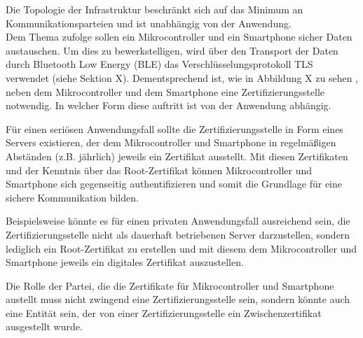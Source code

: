 Die Topologie der Infrastruktur beschränkt sich auf das Minimum an Kommunikationsparteien und ist unabhängig von der Anwendung.\\


Dem Thema zufolge sollen ein Mikrocontroller und ein Smartphone sicher Daten austauschen. Um dies zu bewerkstelligen, wird über den Transport der Daten durch Bluetooth Low Energy (BLE) das Verschlüsselungsprotokoll TLS verwendet (siehe Sektion X). 
Dementsprechend ist, wie in Abbildung X zu sehen
, neben dem Mikrocontroller und dem Smartphone eine Zertifizierungsstelle notwendig. In welcher Form diese auftritt ist von der Anwendung abhängig.

Für einen seriösen Anwendungsfall sollte die Zertifizierungsstelle in Form eines Servers existieren, der dem Mikrocontroller und Smartphone in regelmäßigen Abständen (z.B. jährlich) jeweils ein Zertifikat ausstellt. Mit diesen Zertifikaten und der Kenntnis über das Root-Zertifikat können Mikrocontroller und Smartphone sich gegenseitig authentifizieren und somit die Grundlage für eine sichere Kommunikation bilden.

Beispielsweise könnte es für einen privaten Anwendungsfall ausreichend sein, die Zertifizierungsstelle nicht als dauerhaft betriebenen Server darzustellen, sondern lediglich ein Root-Zertifikat zu erstellen und mit diesem dem Mikrocontroller und Smartphone jeweils ein digitales Zertifikat auszustellen.

Die Rolle der Partei, die die Zertifikate für Mikrocontroller und Smartphone austellt muss nicht zwingend eine Zertifizierungsstelle sein, sondern könnte auch eine Entität sein, der von einer Zertifizierungsstelle ein Zwischenzertifikat ausgestellt wurde.